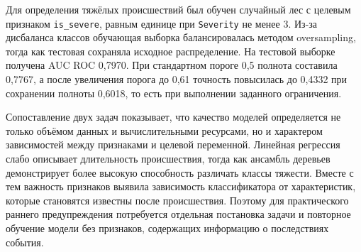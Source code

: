 Для определения тяжёлых происшествий был обучен случайный лес с целевым признаком \texttt{is\_severe}, равным единице при \texttt{Severity} не менее 3. Из-за дисбаланса классов обучающая выборка балансировалась методом oversampling, тогда как тестовая сохраняла исходное распределение. На тестовой выборке получена AUC ROC 0,7970. При стандартном пороге 0,5 полнота составила 0,7767, а после увеличения порога до 0,61 точность повысилась до 0,4332 при сохранении полноты 0,6018, то есть при выполнении заданного ограничения.

Сопоставление двух задач показывает, что качество моделей определяется не только объёмом данных и вычислительными ресурсами, но и характером зависимостей между признаками и целевой переменной. Линейная регрессия слабо описывает длительность происшествия, тогда как ансамбль деревьев демонстрирует более высокую способность различать классы тяжести. Вместе с тем важность признаков выявила зависимость классификатора от характеристик, которые становятся известны после происшествия. Поэтому для практического раннего предупреждения потребуется отдельная постановка задачи и повторное обучение модели без признаков, содержащих информацию о последствиях события.